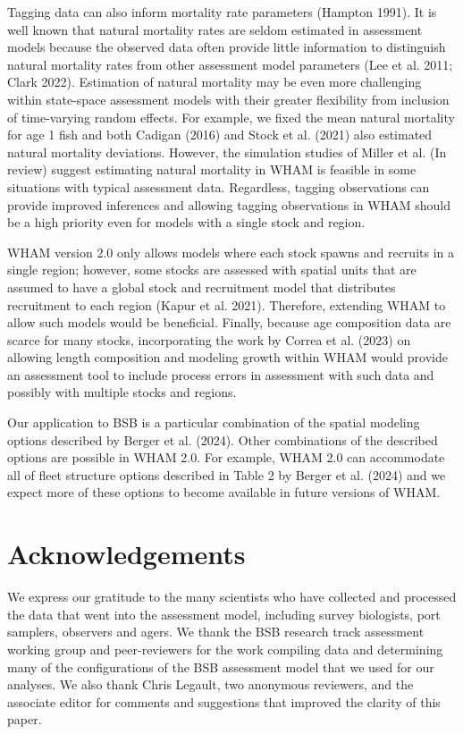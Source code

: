 \documentclass[
]{article}
\begin{document}
Tagging data can also inform mortality rate parameters (Hampton 1991). It is well known that natural mortality rates are seldom estimated in assessment models because the observed data often provide little information to distinguish natural mortality rates from other assessment model parameters (Lee et al. 2011; Clark 2022). Estimation of natural mortality may be even more challenging within state-space assessment models with their greater flexibility from inclusion of time-varying random effects. For example, we fixed the mean natural mortality for age 1 fish and both Cadigan (2016) and Stock et al. (2021) also estimated natural mortality deviations. However, the simulation studies of Miller et al. (In review) suggest estimating natural mortality in WHAM is feasible in some situations with typical assessment data. Regardless, tagging observations can provide improved inferences and allowing tagging observations in WHAM should be a high priority even for models with a single stock and region.

WHAM version 2.0 only allows models where each stock spawns and recruits in a single region; however, some stocks are assessed with spatial units that are assumed to have a global stock and recruitment model that distributes recruitment to each region (Kapur et al. 2021). Therefore, extending WHAM to allow such models would be beneficial. Finally, because age composition data are scarce for many stocks, incorporating the work by Correa et al. (2023) on allowing length composition and modeling growth within WHAM would provide an assessment tool to include process errors in assessment with such data and possibly with multiple stocks and regions.

Our application to BSB is a particular combination of the spatial modeling options described by Berger et al. (2024). Other combinations of the described options are possible in WHAM 2.0. For example, WHAM 2.0 can accommodate all of fleet structure options described in Table 2 by Berger et al. (2024) and we expect more of these options to become available in future versions of WHAM.

\hypertarget{acknowledgements}{%
\section*{Acknowledgements}\label{acknowledgements}}

We express our gratitude to the many scientists who have collected and processed the data that went into the assessment model, including survey biologists, port samplers, observers and agers. We thank the BSB research track assessment working group and peer-reviewers for the work compiling data and determining many of the configurations of the BSB assessment model that we used for our analyses. We also thank Chris Legault, two anonymous reviewers, and the associate editor for comments and suggestions that improved the clarity of this paper.
\end{document}
